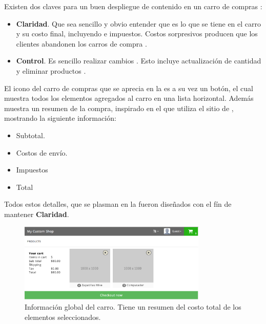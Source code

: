 		Existen dos claves para un buen despliegue de contenido en un carro de compras \cite{online_official_conversionxl_checkout_flow}:
		\begin{itemize}
			\item
				\textbf{Claridad}. Que sea sencillo y obvio entender que es lo que se tiene en el carro y su costo final, incluyendo \shipping e impuestos. Costos sorpresivos producen que los clientes abandonen los carros de compra \cite{online_official_conversionxl_checkout_flow}.
			\item
				\textbf{Control}. Es sencillo realizar cambios \cite{online_official_conversionxl_checkout_flow}. Esto incluye actualización de cantidad y eliminar productos \cite{online_official_conversionxl_shopping_cart_abandonment}.
		\end{itemize}

		El icono del carro de compras que se aprecia en la  es a su vez un botón, el cual muestra todos los elementos agregados al carro en una lista horizontal. Además muestra un resumen de la compra, inspirado en el que utiliza el sitio de \shopifyNAME {}, mostrando la siguiente información: 
		\begin{itemize}
			\item
				Subtotal.
			\item
				Costos de envío.
			\item
				Impuestos
			\item
				Total
		\end{itemize}

		Todos estos detalles, que se plasman en la  fueron diseñados con el fín de mantener \textbf{Claridad}.

		\begin{figure}[H]
			\centering
			\includegraphics[width=0.8\textwidth]{figuras/solution/cart/view.png}
			\caption{Información global del carro. Tiene un resumen del costo total de los elementos seleccionados.}
			\label{figure:solution:cart:view}
		\end{figure}

